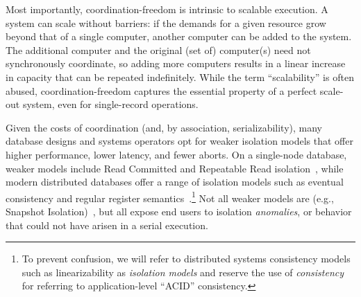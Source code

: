 

 Most importantly,
coordination-freedom is intrinsic to scalable execution. A \cfree
system can scale without barriers: if the demands for a given resource
grow beyond that of a single computer, another computer can be added
to the system. The additional computer and the original (set of)
computer(s) need not synchronously coordinate, so adding more
computers results in a linear increase in capacity that can be
repeated indefinitely. While the term ``scalability'' is often abused,
coordination-freedom captures the essential property of a perfect
scale-out system, even for single-record operations.


 Given the costs of coordination (and, by
association, serializability), many database designs and systems
operators opt for weaker isolation models that offer higher
performance, lower latency, and fewer aborts. On a single-node
database, weaker models include Read Committed and Repeatable Read
isolation~\cite{adya-isolation}, while modern distributed databases
offer a range of isolation models such as eventual consistency and
regular register semantics~\cite{hat-vldb}.\footnote{To prevent
  confusion, we will refer to distributed systems consistency models
  such as linearizability as \textit{isolation models} and reserve the
  use of \textit{consistency} for referring to application-level
  ``ACID'' consistency.}  Not all weaker models are \cfree (e.g.,
Snapshot Isolation)~\cite{hat-vldb}, but all expose end users to
isolation \textit{anomalies}, or behavior that could not have arisen
in a serial execution.


